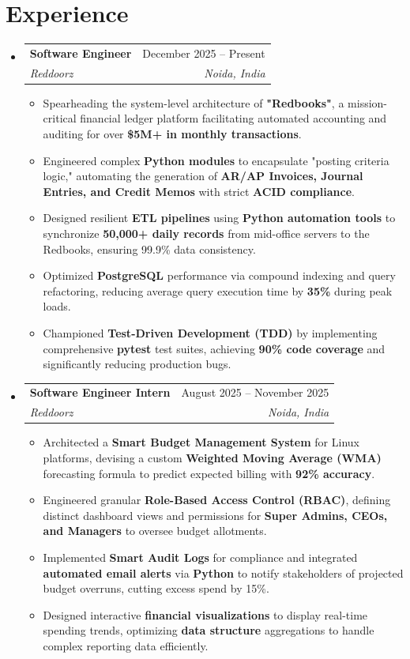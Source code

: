 \documentclass[letterpaper, 10pt]{article}
\makeatletter
\newcommand{\resumeItem}[1]{
  \item\small{
    {#1 \vspace{-1pt}}
  }
}
\newcommand{\resumeSubheading}[4]{
  \vspace{-2pt}\item
    \begin{tabular*}{0.97\textwidth}[t]{l@{\extracolsep{\fill}}r}
      \textbf{#1} & #2 \\
      \textit{\small#3} & \textit{\small #4} \\
    \end{tabular*}\vspace{-5pt}
}
\newcommand{\resumeSubHeadingListStart}{\begin{itemize}[leftmargin=0.05in, label={}]}
\newcommand{\resumeSubHeadingListEnd}{\end{itemize}}
\newcommand{\resumeItemListStart}{\begin{itemize}[itemsep=3pt, parsep=0pt]}
\newcommand{\resumeItemListEnd}{\end{itemize}\vspace{-5pt}}
\makeatother
\begin{document}
\section{Experience}
  \resumeSubHeadingListStart
    \resumeSubheading
      {Software Engineer}{December 2025 -- Present}
      {Reddoorz}{Noida, India}
      \resumeItemListStart
        \resumeItem{Spearheading the system-level architecture of \textbf{"Redbooks"}, a mission-critical financial ledger platform facilitating automated accounting and auditing for over \textbf{\$5M+ in monthly transactions}.}
        \resumeItem{Engineered complex \textbf{Python modules} to encapsulate "posting criteria logic," automating the generation of \textbf{AR/AP Invoices, Journal Entries, and Credit Memos} with strict \textbf{ACID compliance}.}
        \resumeItem{Designed resilient \textbf{ETL pipelines} using \textbf{Python automation tools} to synchronize \textbf{50,000+ daily records} from mid-office servers to the Redbooks, ensuring 99.9\% data consistency.}
        \resumeItem{Optimized \textbf{PostgreSQL} performance via compound indexing and query refactoring, reducing average query execution time by \textbf{35\%} during peak loads.}
        \resumeItem{Championed \textbf{Test-Driven Development (TDD)} by implementing comprehensive \textbf{pytest} test suites, achieving \textbf{90\% code coverage} and significantly reducing production bugs.}
      \resumeItemListEnd

    \resumeSubheading
      {Software Engineer Intern}{August 2025 -- November 2025}
      {Reddoorz}{Noida, India}
      \resumeItemListStart
        \resumeItem{Architected a \textbf{Smart Budget Management System} for Linux platforms, devising a custom \textbf{Weighted Moving Average (WMA)} forecasting formula to predict expected billing with \textbf{92\% accuracy}.}
        \resumeItem{Engineered granular \textbf{Role-Based Access Control (RBAC)}, defining distinct dashboard views and permissions for \textbf{Super Admins, CEOs, and Managers} to oversee budget allotments.}
        \resumeItem{Implemented \textbf{Smart Audit Logs} for compliance and integrated \textbf{automated email alerts} via \textbf{Python} to notify stakeholders of projected budget overruns, cutting excess spend by 15\%.}
        \resumeItem{Designed interactive \textbf{financial visualizations} to display real-time spending trends, optimizing \textbf{data structure} aggregations to handle complex reporting data efficiently.}
      \resumeItemListEnd

  \resumeSubHeadingListEnd
\end{document}
